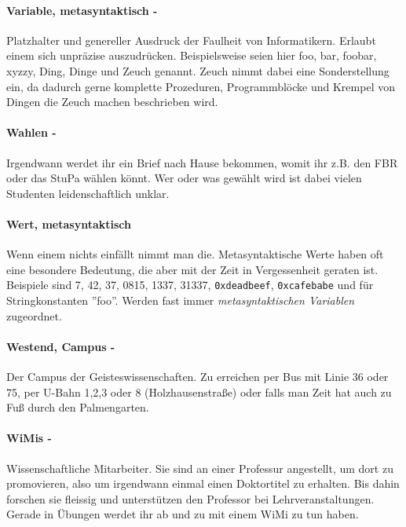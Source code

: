 \paragraph{Variable, metasyntaktisch -} Platzhalter und genereller Ausdruck der Faulheit von Informatikern. Erlaubt einem sich unpr\"azise auszudr\"ucken. Beispielsweise seien hier foo, bar, foobar, xyzzy, Ding, Dinge und Zeuch genannt. Zeuch nimmt dabei eine Sonderstellung ein, da dadurch gerne komplette Prozeduren, Programmbl\"ocke und Krempel von Dingen die Zeuch machen beschrieben wird.
\paragraph{Wahlen -} Irgendwann werdet ihr ein Brief nach Hause bekommen, womit ihr z.B. den FBR oder das StuPa wählen könnt. Wer oder was gew\"ahlt wird ist dabei vielen Studenten leidenschaftlich unklar.
\paragraph{Wert, metasyntaktisch} Wenn einem nichts einf\"allt nimmt man die. Metasyntaktische Werte haben oft eine besondere Bedeutung, die aber mit der Zeit in Vergessenheit geraten ist. Beispiele sind 7, 42, 37, 0815, 1337, 31337, \texttt{0xdeadbeef}, \texttt{0xcafebabe} und f\"ur Stringkonstanten ''foo''. Werden fast immer \textit{metasyntaktischen Variablen} zugeordnet.
\paragraph{Westend, Campus -} Der Campus der Geisteswissenschaften. Zu erreichen per Bus mit Linie 36 oder 75, per U-Bahn 1,2,3 oder 8 (Holzhausenstraße) oder falls man Zeit hat auch zu Fuß durch den Palmengarten.
\paragraph{WiMis -} Wissenschaftliche Mitarbeiter. Sie sind an einer Professur angestellt, um dort zu promovieren, also um irgendwann einmal einen Doktortitel zu erhalten. Bis dahin forschen sie fleissig und unterstützen den Professor bei Lehrveranstaltungen. Gerade in Übungen werdet ihr ab und zu mit einem WiMi zu tun haben.
\spaltenende
